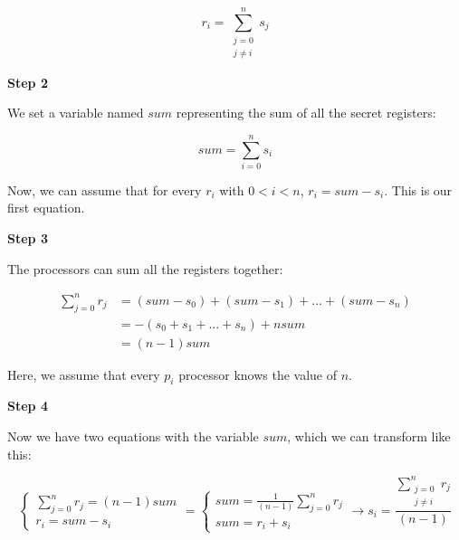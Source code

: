 \documentclass{article}
\begin{document}
\begin{center}
\begin{equation} \label{equation1}
r_{i}=\sum_{\substack{j=0 \\ j\neq i}}^n s_{j}
\end{equation}
\end{center}

\noindent\textbf{Step 2}

We set a variable named $sum$ representing the sum of all the secret registers:

\begin{center}
\begin{equation} \label{equation1}
sum=\sum_{i=0}^n s_{i}
\end{equation}
\end{center}

Now, we can assume that for every $r_{i}$ with $0 < i < n$, $r_{i} = sum - s_{i}$. This is our first equation.

\noindent\textbf{Step 3}

The processors can sum all the registers together:

\begin{center}
\begin{equation} \label{equation1}
\begin{split}
\sum_{j=0}^n r_{j} & = (sum-s_{0})+(sum-s_{1})+...+(sum-s_{n}) \\
     & = -(s_{0}+s_{1}+...+s_{n})+nsum \\
     & = (n-1)sum
\end{split}
\end{equation}
\end{center}

Here, we assume that every $p_{i}$ processor knows the value of $n$.

\noindent\textbf{Step 4}

Now we have two equations with the variable $sum$, which we can transform like this:

\begin{center}
\begin{equation}
    \begin{cases}
      \text{$\sum_{j=0}^n r_{j} = (n-1)sum$}\\
      \text{$r_{i}=sum-s_{i}$}
    \end{cases}   
    =
    \begin{cases}
      \text{$sum=\frac{1}{(n-1)}\sum_{j=0}^n r_{j}$}\\
      \text{$sum=r_{i}+s_{i}$}
    \end{cases}  
    \longrightarrow
    \text{$s_{i}=\frac{\sum_{\substack{j=0 \\ j\neq i}}^n r_{j}}{(n-1)}$}
\end{equation}
\end{center}
\end{document}
